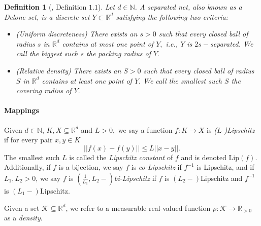 \documentclass{article}
\newtheorem{define}[thm]{Definition}
\newcommand{\R}{\mathbb{R}}
\newcommand{\N}{\mathbb{N}}
\begin{document}
\begin{define}[\cite{lagarias2003repetitive}, Definition $1.1$] \label{define: delone} Let $d \in \N$. A \emph{separated net}, also known as a \emph{Delone set}, is a discrete set $Y \subset \R^d$ satisfying the following two criteria:
\begin{itemize}
    \item (Uniform discreteness) There exists an $s>0$ such that every closed ball of radius $s$ in $\R^d$ contains at most one point of $Y,$ i.e., $Y$ is $2s-$separated. We call the biggest such $s$ the \emph{packing radius} of $Y.$ 
    \item (Relative density) There exists an $S>0$ such that every closed ball of radius $S$ in $\R^d$ contains at least one point of $Y.$ We call the smallest such $S$ the \emph{covering radius} of $Y.$
\end{itemize}
\end{define}

\paragraph{Mappings}
Given $d \in \N$, $K, X \subseteq \R^d$ and $L>0,$ we say a function $f:K \to X$ is \emph{($L$-)Lipschitz} if for every pair $x,y \in K$ $$||f(x)-f(y)|| \leq L||x-y||.$$ The smallest such $L$ is called the \emph{Lipschitz constant} of $f$ and is denoted $\text{Lip}(f).$ Additionally, if $f$ is a bijection, we say $f$ is \emph{co-Lipschitz} if $f^{-1}$ is Lipschitz, and if $L_1,L_2>0$, we say $f$ is \emph{$(\frac{1}{L_1},L_2-)$bi-Lipschitz} if $f$ is $(L_2-)$Lipschitz and $f^{-1}$ is $(L_1-)$Lipschitz. 

Given a set $\mathcal{K} \subseteq \R^d$, we refer to a measurable real-valued function $\rho:\mathcal{K} \rightarrow \mathbb{R}_{>0}$ as a \textit{density}. 
\end{document}
